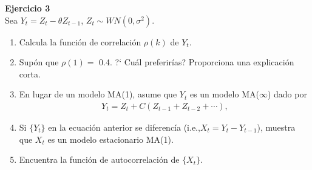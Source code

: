 \documentclass[a4paper, 11pt]{article}
\newenvironment{problem}[2][Ejercicio]
{ \begin{mdframed}[backgroundcolor= red!50] \textbf{#1 #2} \\}
	{  \end{mdframed}}
\begin{document}
\newpage

\begin{problem}{3} 
    Sea $Y_t = Z_t - \theta Z_{t-1}$, $Z_t \sim WN(0,\sigma^2)$.
    \begin{enumerate}
        \item Calcula la función de correlación $\rho(k)$ de $Y_t$.
        \item Supón que $\rho(1) = $ 0.4. ?` Cuál preferirías? Proporciona una explicación corta. 
        \item En lugar de un modelo MA(1), asume que $Y_t$ es un modelo MA($\infty$) dado por 
        \begin{align*}
            Y_t = Z_t + C (Z_{t-1} + Z_{t-2 } + \cdots),
        \end{align*}
        \item Si $\{Y_t \}$ en la ecuación anterior se diferencía (i.e.,$ X_t = Y_t - Y_{t-1}$), muestra que $X_t$ es un modelo estacionario MA(1).
        \item Encuentra la función de autocorrelación de $\{X_t\}$.
    \end{enumerate}
\end{problem}
\end{document}
